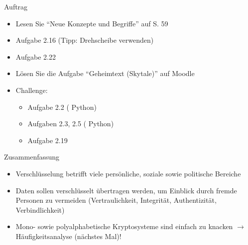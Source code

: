 \begin{frame}[label=auftrag]{Auftrag}
\begin{itemize}
    \item {} Lesen Sie ``Neue Konzepte und Begriffe'' auf S. 59
    \item Aufgabe 2.16 (Tipp: Drehscheibe verwenden)
    \item Aufgabe 2.22
    \item Lösen Sie die Aufgabe ``Geheimtext (Skytale)'' auf Moodle
    \item {} Challenge: 
    \begin{itemize}
        \item Aufgabe 2.2 ( Python)
        \item Aufgaben 2.3, 2.5 ( Python)
        \item Aufgabe 2.19
    \end{itemize}
\end{itemize}
\end{frame}
\begin{frame}[label=summary]{Zusammenfassung}
\begin{itemize}[<+->]
    \item Verschlüsselung betrifft viele persönliche, soziale sowie politische Bereiche
    \item Daten sollen verschlüsselt übertragen werden, um Einblick durch fremde Personen zu vermeiden (Vertraulichkeit, Integrität, Authentizität, Verbindlichkeit)
    \item Mono- sowie polyalphabetische Kryptosysteme sind einfach zu knacken $\rightarrow$ Häufigkeitsanalyse (nächstes Mal)!
\end{itemize}
\end{frame}